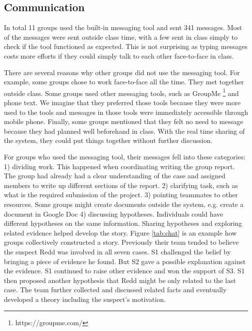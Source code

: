 \subsection{Communication}
In total 11 groups used the built-in messaging tool and sent 341 messages. Most of the messages were sent outside class time, with a few sent in class simply to check if the tool functioned as expected. This is not surprising as typing messages costs more efforts if they could simply talk to each other face-to-face in class.

There are several reasons why other groups did not use the messaging tool. For example, some groups chose to work face-to-face all the time. They met together outside class. Some groups used other messaging tools, such as GroupMe \footnote{https://groupme.com/} and phone text. We imagine that they preferred those tools because they were more used to the tools and messages in those tools were immediately accessible through mobile phone. Finally, some groups mentioned that they felt no need to message because they had planned well beforehand in class. With the real time sharing of the system, they could put things together without further discussion.

For groups who used the messaging tool, their messages fell into these categories: 1) dividing work. This happened when coordinating writing the group report. The group had already had a clear understanding of the case and assigned members to write up different sections of the report. 2) clarifying task, such as what is the required submission of the project. 3) pointing teammates to other resources. Some groups might create documents outside the system, e.g. create a document in Google Doc 4) discussing hypotheses. Individuals could have different hypotheses on the same information. Sharing hypotheses and exploring related evidence helped develop the story. Figure \ref{tab:chat} is an example how groups collectively constructed a story. Previously their team tended to believe the suspect Redd was involved in all seven cases. S1 challenged the belief by bringing a piece of evidence he found. But S2 gave a possible explanation against the evidence. S1 continued to raise other evidence and won the support of S3. S1 then proposed another hypothesis that Redd might be only related to the last case. The team further collected and discussed related facts and eventually developed a theory including the suspect's motivation.


